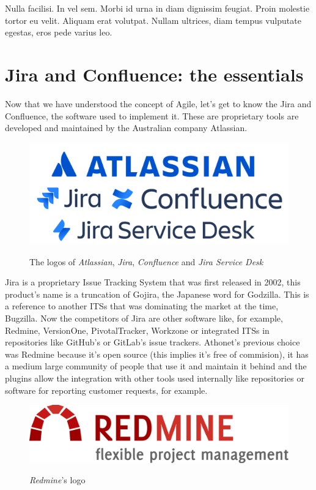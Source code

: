 \begin{savequote}[75mm]
Nulla facilisi. In vel sem. Morbi id urna in diam dignissim feugiat. Proin molestie tortor eu velit. Aliquam erat volutpat. Nullam ultrices, diam tempus vulputate egestas, eros pede varius leo.
\end{savequote}

\chapter{Jira and Confluence: the essentials}

Now that we have understood the concept of Agile, let's get to know the Jira and Confluence, the software used to implement it.
These are proprietary tools are developed and maintained by the Australian company Atlassian.

\begin{figure}[H]
	\centering
	\includegraphics[width=.7\textwidth]{resources/atlassian_logo}\\
	\caption{The logos of \textit{Atlassian}, \textit{Jira}, \textit{Confluence} and \textit{Jira Service Desk}}
\end{figure}

Jira is a proprietary Issue Tracking System that was first released in 2002, this product's name is a truncation of Gojira, the Japanese word for Godzilla.
This is a reference to another ITSs that was dominating the market at the time, Bugzilla.
Now the competitors of Jira are other software like, for example, Redmine, VersionOne, PivotalTracker, Workzone or integrated ITSs in repositories like GitHub's or GitLab's issue trackers.
Athonet's previous choice was Redmine because it's open source (this implies it's free of commision), it has a medium large community of people that use it and maintain it behind and the plugins allow the integration with other tools used internally like repositories or software for reporting customer requests, for example.

\begin{figure}[H]
	\centering
	\includegraphics[width=.6\textwidth]{resources/redmine_logo}\\
	\caption{\textit{Redmine}'s logo}
\end{figure}

